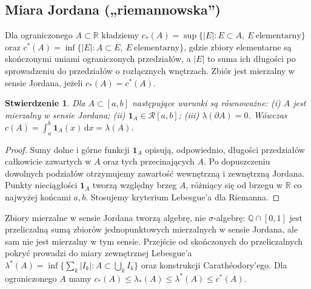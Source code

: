 \documentclass[11pt,a4paper]{article}
\numberwithin{equation}{section}
\theoremstyle{plain}
\newtheorem{stwierdzenie}[twierdzenie]{Stwierdzenie}
\theoremstyle{definition}
\theoremstyle{remark}
\newcommand{\R}{\mathbb R}
\newcommand{\Q}{\mathbb Q}
\newcommand{\ind}[1]{\mathbf 1_{#1}}
\begin{document}
\subsection*{Miara Jordana („riemannowska”)}
Dla ograniczonego $A\subset\R$ kładziemy $c_*(A)=\sup\{|E|:E\subset A,\ E\ \text{elementarny}\}$ oraz $c^*(A)=\inf\{|E|:A\subset E,\ E\ \text{elementarny}\}$, gdzie zbiory elementarne są skończonymi uniami ograniczonych przedziałów, a $|E|$ to suma ich długości po sprowadzeniu do przedziałów o rozłącznych wnętrzach. Zbiór jest mierzalny w sensie Jordana, jeżeli $c_*(A)=c^*(A)$.
\begin{stwierdzenie}
Dla $A\subset[a,b]$ następujące warunki są równoważne: (i) $A$ jest mierzalny w sensie Jordana; (ii) $\ind A\in\mathcal R[a,b]$; (iii) $\lambda(\partial A)=0$. Wówczas $c(A)=\int_a^b\ind A(x)\,\mathrm dx=\lambda(A)$.
\end{stwierdzenie}
\begin{proof}
Sumy dolne i górne funkcji $\ind A$ opisują, odpowiednio, długości przedziałów całkowicie zawartych w $A$ oraz tych przecinających $A$. Po dopuszczeniu dowolnych podziałów otrzymujemy zawartość wewnętrzną i zewnętrzną Jordana. Punkty nieciągłości $\ind A$ tworzą względny brzeg $A$, różniący się od brzegu w $\R$ co najwyżej końcami $a,b$. Stosujemy kryterium Lebesgue'a dla Riemanna.
\end{proof}
Zbiory mierzalne w sensie Jordana tworzą algebrę, nie $\sigma$-algebrę: $\Q\cap[0,1]$ jest przeliczalną sumą zbiorów jednopunktowych mierzalnych w sensie Jordana, ale sam nie jest mierzalny w tym sensie. Przejście od skończonych do przeliczalnych pokryć prowadzi do miary zewnętrznej Lebesgue'a $\lambda^*(A)=\inf\{\sum_k|I_k|:A\subset\bigcup_kI_k\}$ oraz konstrukcji Carathéodory'ego. Dla ograniczonego $A$ mamy $c_*(A)\le\lambda_*(A)\le\lambda^*(A)\le c^*(A)$.
\end{document}
